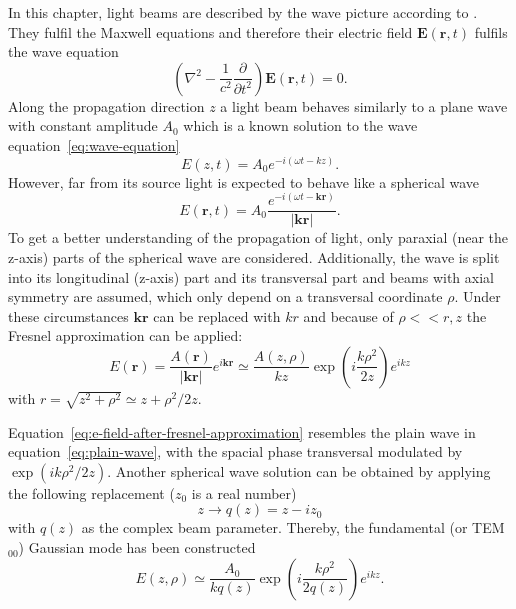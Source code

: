 In this chapter, light beams are described by the wave picture according to \textcite{meschede_optik_2008}.
They fulfil the Maxwell equations and therefore their electric field $\mathbf{E}(\mathbf{r},t)$  fulfils the wave equation
\begin{equation}
\label{eq:wave-equation}
\left(\nabla^2 - \frac{1}{c^2}\frac{\partial}{\partial t^2}\right)\mathbf{E}(\mathbf{r},t) = 0.
\end{equation}
Along the propagation direction $z$ a light beam behaves similarly to a plane wave with constant amplitude $A_0$ which is a known solution to the wave equation~\eqref{eq:wave-equation}
\begin{equation}
\label{eq:plain-wave}
E(z,t)=A_0e^{-i(\omega t - kz)}.
\end{equation}
However, far from its source light is expected to behave like a spherical wave
\begin{equation}
E(\mathbf{r},t)=A_0\frac{e^{-i(\omega t -\mathbf{kr})}}{|\mathbf{kr}|}.
\end{equation}
To get a better understanding of the propagation of light, only paraxial (near the z-axis) parts  of the spherical wave are considered.
Additionally, the wave is split into its longitudinal (z-axis) part and its transversal part and beams with axial symmetry are assumed, which only depend on a transversal coordinate $\rho$.
Under these circumstances $\mathbf{kr}$ can be replaced with $kr$ and because of $\rho<<r,z$ the Fresnel approximation can be applied:
\begin{equation}
\label{eq:e-field-after-fresnel-approximation}
E(\mathbf{r})=\frac{A(\mathbf{r})}{|\mathbf{kr}|}e^{i\mathbf{kr}}\simeq\frac{A(z,\rho)}{kz}\exp\left(i\frac{k\rho^2}{2z}\right)e^{ikz}
\end{equation}
with $r = \sqrt{z^2+\rho^2} \simeq z+\rho^2/2z$.

Equation~\eqref{eq:e-field-after-fresnel-approximation} resembles the plain wave in equation~\eqref{eq:plain-wave}, with the spacial phase transversal modulated by $\exp(ik\rho^2/2z)$.
Another spherical wave solution can be obtained by applying the following replacement ($z_0$ is a real number)
\begin{equation}
z \rightarrow q(z)=z-iz_0
\end{equation}
with $q(z)$ as the complex beam parameter.
Thereby, the fundamental (or TEM$_{00}$) Gaussian mode has been constructed
\begin{equation}
\label{eq:fundamental-gaussian-mode}
E(z,\rho)\simeq\frac{A_0}{kq(z)}\exp\left(i\frac{k\rho^2}{2q(z)}\right)e^{ikz}.
\end{equation}

